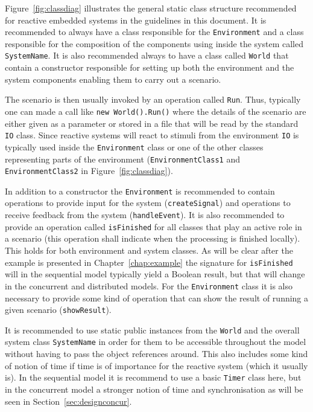 \documentclass{overturerepchap}
\begin{document}
Figure~\ref{fig:classdiag} illustrates the general static class structure 
recommended for reactive embedded systems in the guidelines in this document.
It is recommended to always have a class responsible for the 
\texttt{Environment} and a class responsible for the composition of the
components using inside the system called \texttt{SystemName}. It is also
recommended always to have a class called \texttt{World} that contain 
a constructor responsible for setting up both the environment and the 
system components enabling them to carry out a scenario. 

The scenario is
then usually invoked by an operation called \texttt{Run}. Thus, typically
one can made a call like \texttt{new World().Run()} where the details
of the scenario are either given as a parameter or stored in a file that
will be read by the standard \texttt{IO} class. Since reactive systems 
will react to stimuli from the environment \texttt{IO} is typically used 
inside the \texttt{Environment} class or one of the other classes 
representing parts of the environment (\texttt{EnvironmentClass1} and 
\texttt{EnvironmentClass2} in Figure~\ref{fig:classdiag}).

In addition to a constructor the \texttt{Environment} is recommended to 
contain operations to provide input for the system (\texttt{createSignal})
and operations to receive feedback from the system (\texttt{handleEvent}). 
It is also recommended to provide an operation called \texttt{isFinished}
for all classes that play an active role in a scenario (this operation shall
indicate when the processing is finished locally). This holds for
both environment and system classes. As will be clear after the  
example is presented in Chapter~\ref{chap:example} the signature for 
\texttt{isFinished} will in the sequential model typically yield a Boolean
result, but that will change in the concurrent and distributed models.
For the \texttt{Environment} class 
it is also necessary to provide some kind of operation that can show the
result of running a given scenario (\texttt{showResult}).

It is recommended to use static public instances from the \texttt{World}
and the overall system class \texttt{SystemName} in order for them to be 
accessible throughout the model without having to pass the object references
around. This also includes some kind of notion of time if time is of 
importance for the reactive system (which it usually is). In the sequential
model it is recommend to use a basic \texttt{Timer} class here, but in the 
concurrent model a stronger notion of time and synchronisation as will be seen
in Section~\ref{sec:designconcur}.
\end{document}
